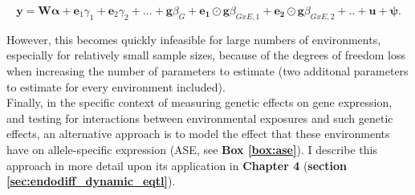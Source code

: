 \begin{equation}\label{eq:multi_interaction_test_FE_LMM}
 \mathbf{y} =  \mathbf{W}\boldsymbol{\alpha} + \mathbf{e}_1\gamma_1 + \mathbf{e}_2\gamma_2 + ...  + \mathbf{g}\beta_G + \mathbf{e_1}\odot\mathbf{g}\beta_{GxE,1}+ \mathbf{e_2}\odot\mathbf{g}\beta_{GxE,2} + .. + \mathbf{u} + \boldsymbol{\psi}. 
\end{equation}

However, this becomes quickly infeasible for large numbers of environments, especially for relatively small sample sizes, because of the degrees of freedom loss when increasing the number of parameters to estimate (two additonal parameters to estimate for every environment included). \\

Finally, in the specific context of measuring genetic effects on gene expression, and testing for interactions between environmental exposures and such genetic effects, an alternative approach is to model the effect that these environments have on allele-specific expression (ASE, see \textbf{Box \ref{box:ase}}).
I describe this approach in more detail upon its application in \textbf{Chapter 4} (\textbf{section \ref{sec:endodiff_dynamic_eqtl}}).





